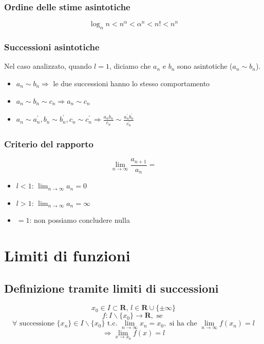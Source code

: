 \documentclass{report}
\begin{document}
    \subsubsection{Ordine delle stime asintotiche}
        $$\log_{\alpha}n < n^{\alpha} < \alpha^n < n! < n^n$$ 
    \subsubsection{Successioni asintotiche}
        Nel caso analizzato, quando $l = 1$, diciamo che $a_n$ e $b_n$ sono 
        asintotiche ($a_n \sim b_n$). \\
        \begin{itemize}
            \item $a_n \sim b_n \Longrightarrow$ le due successioni hanno lo stesso comportamento
            \item $a_n \sim b_n \sim c_n \Longrightarrow a_n \sim c_n$
            \item $a_n \sim a^{'}_n, b_n \sim b^{'}_n, c_n \sim c^{'}_n \Longrightarrow 
                \frac{a_nb_n}{c_n} \sim \frac{a^{'}_nb^{'}_n}{c^{'}_n}$
        \end{itemize}
    \subsubsection{Criterio del rapporto}
    $$\lim_{n \to \infty} \frac{a_{n+1}}{a_n} = $$
    \begin{itemize}
        \item $l < 1$: $\lim_{n \to \infty}a_n = 0$
        \item $l > 1$: $\lim_{n \to \infty}a_n = \infty$
        \item $= 1$: non possiamo concludere nulla
    \end{itemize}
\section{Limiti di funzioni}
    \subsection{Definizione tramite limiti di successioni}
        $$x_0 \in I \subset \mathbf{R}, \, l \in \mathbf{R} \cup \{\pm\infty\}$$
        $$f: I\backslash\{x_0\} \longrightarrow \mathbf{R}, \textrm{ se }$$
        $$\forall \textrm{ successione } \{x_n\} \in I\backslash\{x_0\} \textrm { t.c. }
            \lim_{n \to \infty} x_n = x_0, \textrm { si ha che } \lim_{n \to \infty} f\left(x_n\right) = l $$
        $$ \Longrightarrow \lim_{x \to x_0} f\left(x\right) = l $$
\end{document}
